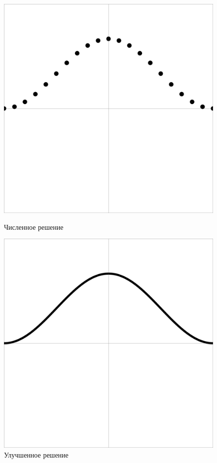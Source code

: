 \documentclass{beamer}
\begin{document}
\begin{frame}
\begin{figure}
	\centering
	\begin{minipage}{0.45\textwidth}
		\centering
		\includegraphics[width=\textwidth]{primer1_1}
		\caption{Численное решение}
		\label{fig:first}
	\end{minipage}\hfill
	\begin{minipage}{0.45\textwidth}
		\centering
		\includegraphics[width=\textwidth]{test4}
		\caption{Улучшенное решение}
		\label{fig:second}
	\end{minipage}
\end{figure}
\end{frame}
\end{document}
